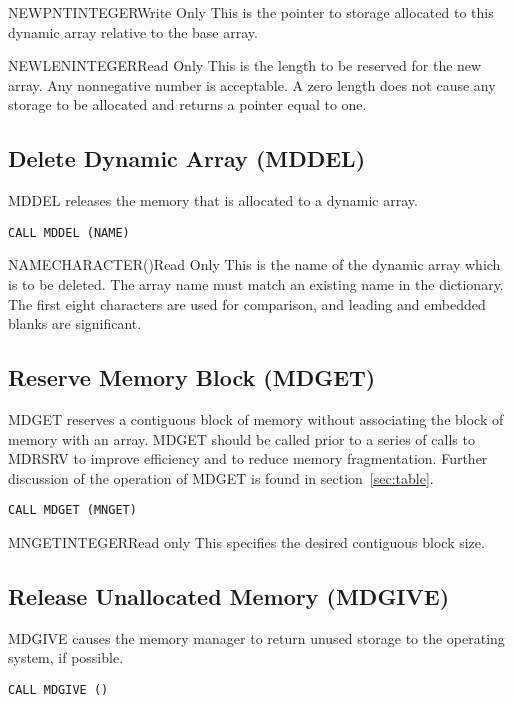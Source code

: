 \begin{argy}{NEWPNT}{INTEGER}{Write Only}
This is the pointer to storage allocated to this dynamic array relative to
the base array. 
\end{argy}

\begin{argy}{NEWLEN}{INTEGER}{Read Only}
This is the length to be reserved for the new array. Any nonnegative number
is acceptable.  A zero length does not cause any storage to be allocated and
returns a pointer equal to one. 
\end{argy}

\subsection{Delete Dynamic Array (MDDEL)}
MDDEL releases the memory that is allocated to a dynamic array.

\verb+CALL MDDEL (NAME)+

\begin{argy}{NAME}{CHARACTER\last(\last)}{Read Only}
This is the name of the dynamic array which is to be deleted.  The array
name must match an existing name in the dictionary.  The first eight
characters are used for comparison, and leading and embedded blanks are
significant. 
\end{argy}

\subsection{Reserve Memory Block (MDGET)}
MDGET reserves a contiguous block of memory without associating the block of
memory with an array.  MDGET should be called prior to a series of calls to
MDRSRV to improve efficiency and to reduce memory fragmentation.  Further
discussion of the operation of MDGET is found in section~\ref{sec:table}.

\verb+CALL MDGET (MNGET)+

\begin{argy}{MNGET}{INTEGER}{Read only}
This specifies the desired contiguous block size.
\end{argy}

\subsection{Release Unallocated Memory (MDGIVE)}
MDGIVE causes the memory manager to return unused storage to the operating
system, if possible.

\verb+CALL MDGIVE ()+


